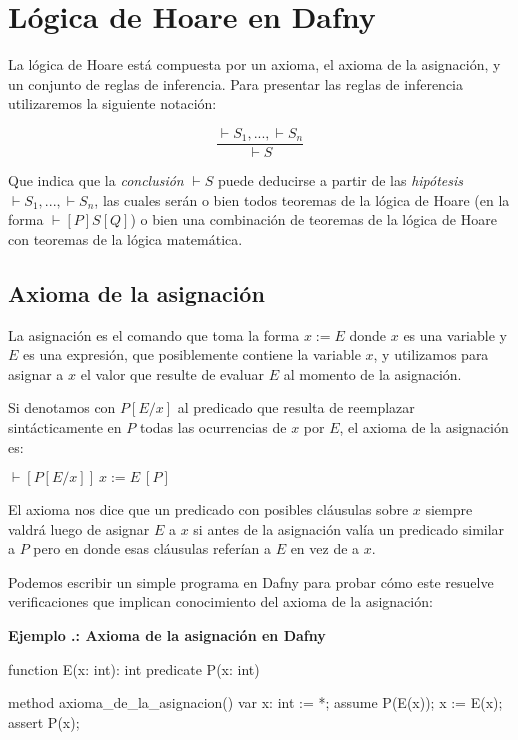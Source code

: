 \documentclass[12pt, a4paper, openany, fleqn]{book}
\newcounter{example}[chapter]
\renewcommand{\theexample}{\thechapter.\arabic{example}}
\newcommand{\example}[1]{
  \refstepcounter{example} %
  \vspace{1em}
  \noindent\textbf{Ejemplo \theexample: #1}
}
\newcommand{\hoareTheorem}[3]{\ensuremath{\vdash[#1]\ #2\ [#3]}}
\newcommand{\inferenceRule}[2]{
    \begin{equation*}
        \frac{#1}{#2}
    \end{equation*}
}
\begin{document}
    \section{Lógica de Hoare en Dafny}
    La lógica de Hoare está compuesta por un axioma, el axioma de la asignación, y un conjunto de reglas de inferencia. Para presentar las reglas de inferencia utilizaremos la siguiente notación:
    \inferenceRule{\vdash S_1, ..., \vdash S_n}{\vdash S}
    Que indica que la \textit{conclusión} $\vdash S$ puede deducirse a partir de las \textit{hipótesis} $\vdash S_1, ..., \vdash S_n$, las cuales serán o bien todos teoremas de la lógica de Hoare (en la forma $\vdash[P]S[Q]$) o bien una combinación de teoremas de la lógica de Hoare con teoremas de la lógica matemática.

    \subsection{Axioma de la asignación}
    La asignación es el comando que toma la forma $x := E$ donde $x$ es una variable y $E$ es una expresión, que posiblemente contiene la variable $x$, y utilizamos para asignar a $x$ el valor que resulte de evaluar $E$ al momento de la asignación.

    Si denotamos con $P[E/x]$ al predicado que resulta de reemplazar sintácticamente en $P$ todas las ocurrencias de $x$ por $E$, el axioma de la asignación es:

    \begin{center}
        \hoareTheorem{P[E/x]}{x:=E}{P}
    \end{center}

    El axioma nos dice que un predicado con posibles cláusulas sobre $x$ siempre valdrá  luego de asignar $E$ a $x$ si antes de la asignación valía un predicado similar a $P$ pero en donde esas cláusulas referían a $E$ en vez de a $x$.

    Podemos escribir un simple programa en Dafny para probar cómo este resuelve verificaciones que implican conocimiento del axioma de la asignación:

    \example{Axioma de la asignación en Dafny}
    \begin{greenbox}
    \begin{dafny}[gobble=8]
        function E(x: int): int
        predicate P(x: int)

        method axioma_de_la_asignacion()
        {
            var x: int := *;
            assume P(E(x));
            x := E(x);
            assert P(x);
        }
    \end{dafny}
    \end{greenbox}
    \vspace{1em}
\end{document}
